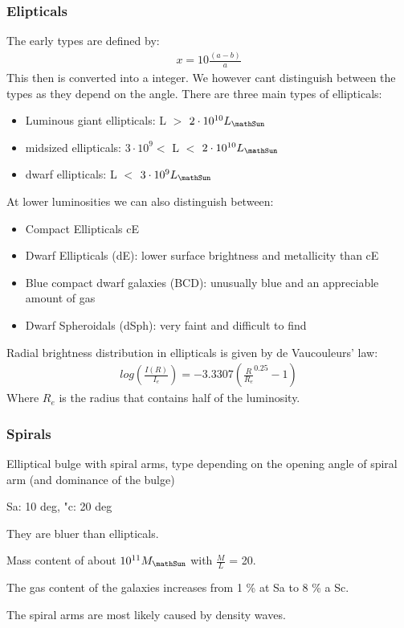\documentclass[11pt,a4paper]{article}
\begin{document}
\subsubsection{Elipticals}
The early types are defined by: 
\begin{align*}
    x = 10 \frac {(a-b)}{a}
\end{align*}
This then is converted into a integer.
We however cant distinguish between the types as they depend on the angle.
There are three main types of ellipticals:
\begin{itemize}
    \item Luminous giant ellipticals: L $>$ $2 \cdot 10^{10} L_\mathSun$
    \item midsized ellipticals: $3 \cdot 10^9 <$ L $<$ $2 \cdot 10^{10} L_\mathSun$
    \item dwarf ellipticals: L $<$ $3 \cdot 10^9 L_\mathSun$
\end{itemize}
At lower luminosities we can also distinguish between:
\begin{itemize}
    \item Compact Ellipticals cE 
    \item Dwarf Ellipticals (dE): lower surface brightness and metallicity than cE
    \item Blue compact dwarf galaxies (BCD): unusually blue and an appreciable
amount of gas
\item Dwarf Spheroidals (dSph): very faint and difficult to find
\end{itemize}
Radial brightness distribution in ellipticals is
given by de Vaucouleurs’ law:
\begin{align*}
    log (\frac {I(R)}{I_e})  = - 3.3307 (\frac {R}{R_e}^{0.25}-1)
\end{align*}
Where $R_e$ is the radius that contains half of the luminosity.
\subsubsection{Spirals}
Elliptical bulge with spiral arms, type depending on the opening angle of spiral arm (and dominance of the bulge)

Sa: 10 deg, "c: 20 deg

They are bluer than ellipticals.

Mass content of about $10^{11} M_\mathSun$ with $\frac M L $ = 20.

The gas content of the galaxies increases from 1 \% at Sa to 8 \%  a Sc.

The spiral arms are most likely caused by density waves.
\end{document}
